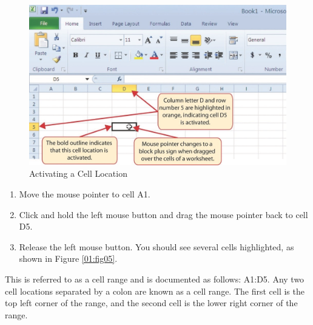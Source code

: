 \begin{figure}[H]
	\centering
	\includegraphics[width=\maxwidth{.95\linewidth}]{gfx/Ch01_fig04}
	\caption{Activating a Cell Location}
	\label{01:fig04}
\end{figure}

\begin{enumerate}
	\item Move the mouse pointer to cell \textsf{A1}.
	\item Click and hold the left mouse button and drag the mouse pointer back to cell \textsf{D5}.
	\item Release the left mouse button. You should see several cells highlighted, as shown in Figure \ref{01:fig05}.
\end{enumerate}

This is referred to as a cell range and is documented as follows: \textsf{A1:D5}. Any two cell locations separated by a colon are known as a cell range. The first cell is the top left corner of the range, and the second cell is the lower right corner of the range.

